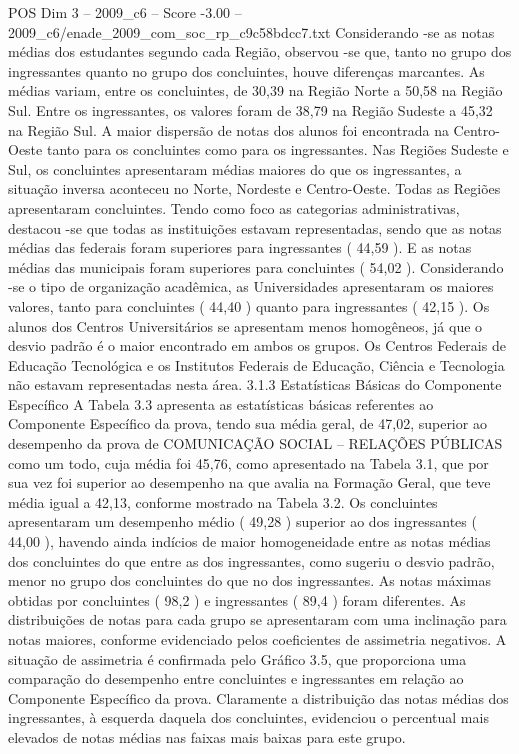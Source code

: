 \begin{textsample}{POS Dim 3 – 2009\_c6 – Score -3.00 – 2009\_c6/enade\_2009\_com\_soc\_rp\_c9c58bdcc7.txt}
Considerando -se as notas médias dos estudantes segundo cada Região, observou -se que, tanto no grupo dos ingressantes quanto no grupo dos concluintes, houve diferenças marcantes.
As médias variam, entre os concluintes, de 30,39 na Região Norte a 50,58 na Região Sul.
Entre os ingressantes, os valores foram de 38,79 na Região Sudeste a 45,32 na Região Sul.
A maior dispersão de notas dos alunos foi encontrada na Centro-Oeste tanto para os concluintes como para os ingressantes.
Nas Regiões Sudeste e Sul, os concluintes apresentaram médias maiores do que os ingressantes, a situação inversa aconteceu no Norte, Nordeste e Centro-Oeste.
Todas as Regiões apresentaram concluintes.
Tendo como foco as categorias administrativas, destacou -se que todas as instituições estavam representadas, sendo que as notas médias das federais foram superiores para ingressantes ( 44,59 ).
E as notas médias das municipais foram superiores para concluintes ( 54,02 ).
Considerando -se o tipo de organização acadêmica, as Universidades apresentaram os maiores valores, tanto para concluintes ( 44,40 ) quanto para ingressantes ( 42,15 ).
Os alunos dos Centros Universitários se apresentam menos homogêneos, já que o desvio padrão é o maior encontrado em ambos os grupos.
Os Centros Federais de Educação Tecnológica e os Institutos Federais de Educação, Ciência e Tecnologia não estavam representadas nesta área. 3.1.3 Estatísticas Básicas do Componente Específico A Tabela 3.3 apresenta as estatísticas básicas referentes ao Componente Específico da prova, tendo sua média geral, de 47,02, superior ao desempenho da prova de COMUNICAÇÃO SOCIAL – RELAÇÕES PÚBLICAS como um todo, cuja média foi 45,76, como apresentado na Tabela 3.1, que por sua vez foi superior ao desempenho na que avalia na Formação Geral, que teve média igual a 42,13, conforme mostrado na Tabela 3.2.
Os concluintes apresentaram um desempenho médio ( 49,28 ) superior ao dos ingressantes ( 44,00 ), havendo ainda indícios de maior homogeneidade entre as notas médias dos concluintes do que entre as dos ingressantes, como sugeriu o desvio padrão, menor no grupo dos concluintes do que no dos ingressantes.
As notas máximas obtidas por concluintes ( 98,2 ) e ingressantes ( 89,4 ) foram diferentes.
As distribuições de notas para cada grupo se apresentaram com uma inclinação para notas maiores, conforme evidenciado pelos coeficientes de assimetria negativos.
A situação de assimetria é confirmada pelo Gráfico 3.5, que proporciona uma comparação do desempenho entre concluintes e ingressantes em relação ao Componente Específico da prova.
Claramente a distribuição das notas médias dos ingressantes, à esquerda daquela dos concluintes, evidenciou o percentual mais elevados de notas médias nas faixas mais baixas para este grupo.

\end{textsample}

